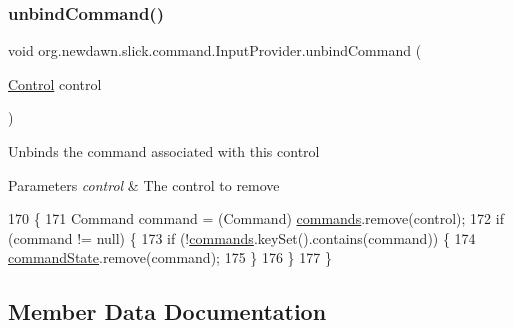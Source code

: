 \subsubsection{\texorpdfstring{unbind\+Command()}{unbindCommand()}}
{\footnotesize\ttfamily void org.\+newdawn.\+slick.\+command.\+Input\+Provider.\+unbind\+Command (\begin{DoxyParamCaption}\item[{\mbox{\hyperlink{interfaceorg_1_1newdawn_1_1slick_1_1command_1_1_control}{Control}}}]{control }\end{DoxyParamCaption})\hspace{0.3cm}{\ttfamily [inline]}}

Unbinds the command associated with this control


\begin{DoxyParams}{Parameters}
{\em control} & The control to remove \\
\hline
\end{DoxyParams}

\begin{DoxyCode}
170                                                \{
171         Command command = (Command) \mbox{\hyperlink{classorg_1_1newdawn_1_1slick_1_1command_1_1_input_provider_ab2bd0c08506a59bc7457d7a87cf873d2}{commands}}.remove(control);
172         \textcolor{keywordflow}{if} (command != null) \{
173             \textcolor{keywordflow}{if} (!\mbox{\hyperlink{classorg_1_1newdawn_1_1slick_1_1command_1_1_input_provider_ab2bd0c08506a59bc7457d7a87cf873d2}{commands}}.keySet().contains(command)) \{
174                 \mbox{\hyperlink{classorg_1_1newdawn_1_1slick_1_1command_1_1_input_provider_a343fea436b5ad6194968443cc58a632d}{commandState}}.remove(command);
175             \}
176         \}
177     \}
\end{DoxyCode}


\subsection{Member Data Documentation}
\mbox{\label{classorg_1_1newdawn_1_1slick_1_1command_1_1_input_provider_ad390b811fb89db3fde054cc1ecae20b0}} 
